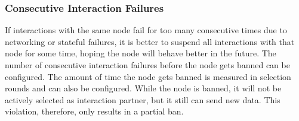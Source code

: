 \makeatletter
\setlength{\@fptop}{0pt}
\makeatother
\begin{figure}[H]
\end{figure}

\subsubsection*{Consecutive Interaction Failures}
If interactions with the same node fail for too many consecutive times due to networking or stateful failures, it is better to suspend all interactions with that node for some time, hoping the node will behave better in the future.
The number of consecutive interaction failures before the node gets banned can be configured.
The amount of time the node gets banned is measured in selection rounds and can also be configured.
While the node is banned, it will not be actively selected as interaction partner, but it still can send new data.
This violation, therefore, only results in a partial ban.

